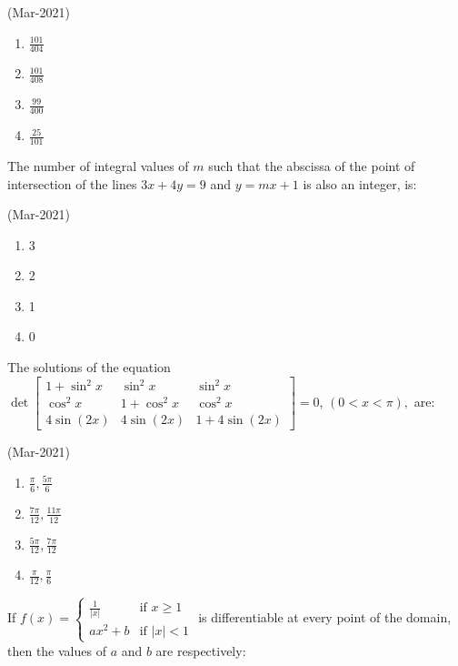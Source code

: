 			\hfill{(Mar-2021)}
			\begin{multicols}{4}
                \begin{enumerate}
    \item $\frac{101}{404}$
    \item $\frac{101}{408}$
    \item $\frac{99}{400}$
    \item $\frac{25}{101}$
                \end{enumerate}
			\end{multicols}
	\item
		The number of integral values of $m$ such that the abscissa of the point of intersection of the lines $3x + 4y = 9$ and $y = mx + 1$ is also an integer, is:

			\hfill{(Mar-2021)}
			\begin{multicols}{4}
                \begin{enumerate}
    \item 3
    \item 2
    \item 1
    \item 0
                \end{enumerate}
			\end{multicols}
	\item
		The solutions of the equation $ \det\begin{bmatrix}
1 + \sin^2 x & \sin^2 x & \sin^2 x \\
\cos^2 x & 1 + \cos^2 x & \cos^2 x \\
4\sin(2x) & 4\sin(2x) & 1 + 4\sin(2x)
		\end{bmatrix} = 0 $, $(0 < x < \pi),$ are:

			\hfill{(Mar-2021)}
			\begin{multicols}{2}
		\begin{enumerate}
    \item $ \frac{\pi}{6}, \frac{5\pi}{6} $
    \item $ \frac{7\pi}{12}, \frac{11\pi}{12} $
    \item $ \frac{5\pi}{12}, \frac{7\pi}{12} $
    \item $ \frac{\pi}{12}, \frac{\pi}{6} $
                \end{enumerate}
			\end{multicols}
	\item
			If $f(x) = \begin{cases} \frac{1}{|x|} & \text{if } x \geq 1 \\ ax^2 + b & \text{if } |x| < 1 \end{cases}$ is differentiable at every point of the domain, then the values of $a$ and $b$ are respectively:

